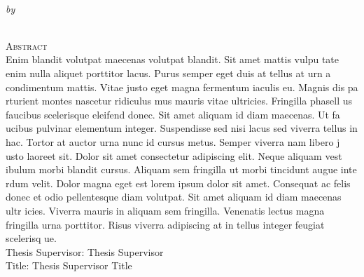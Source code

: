 \begin{center}
{\large \@title} \\
\emph{\footnotesize by} \\
\@author \\
\end{center}

\begin{singlespace}
{\parindent0pt 
	{\large \textsc{Abstract}} \\ %

	Enim blandit volutpat maecenas volutpat blandit. Sit amet mattis vulpu
	tate enim nulla aliquet porttitor lacus. Purus semper eget duis at tellus at urn
	a condimentum mattis. Vitae justo eget magna fermentum iaculis eu. Magnis dis pa
	rturient montes nascetur ridiculus mus mauris vitae ultricies. Fringilla phasell
	us faucibus scelerisque eleifend donec. Sit amet aliquam id diam maecenas. Ut fa
	ucibus pulvinar elementum integer. Suspendisse sed nisi lacus sed viverra tellus
	 in hac. Tortor at auctor urna nunc id cursus metus. Semper viverra nam libero j
	usto laoreet sit. Dolor sit amet consectetur adipiscing elit. Neque aliquam vest
	ibulum morbi blandit cursus. Aliquam sem fringilla ut morbi tincidunt augue inte
	rdum velit. Dolor magna eget est lorem ipsum dolor sit amet. Consequat ac felis 
	donec et odio pellentesque diam volutpat. Sit amet aliquam id diam maecenas ultr
	icies. Viverra mauris in aliquam sem fringilla. Venenatis lectus magna fringilla
	 urna porttitor. Risus viverra adipiscing at in tellus integer feugiat scelerisq
	ue. \\

	\noindent Thesis Supervisor: Thesis Supervisor \\
	\noindent Title: Thesis Supervisor Title
}
\end{singlespace}

\newpage
\null
\thispagestyle{empty}
\newpage